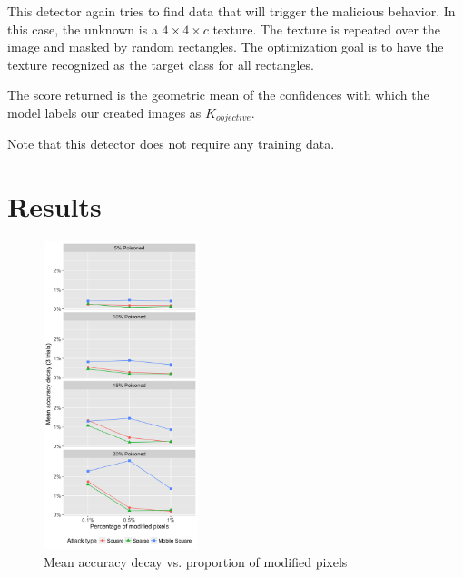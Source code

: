 \documentclass[letterpaper, 10 pt, conference]{ieeeconf}  %
\begin{document}
This detector again tries to find data that will trigger the malicious
behavior.  In this case, the unknown is a $4\times 4\times c$ texture.  The
texture is repeated over the image and masked by random rectangles.  The
optimization goal is to have the texture recognized as the target
class for all rectangles.

The score returned is the geometric mean of the confidences with which
the model labels our created images as $K_{objective}$.

Note that this detector does not require any training data.

\section{Results}

\begin{figure}[h]
\centering
\includegraphics[width=0.4\textwidth]{mean_acc.png}
\caption{Mean accuracy decay vs. proportion of modified pixels}
\label{fig:acc}
\end{figure}
\end{document}
